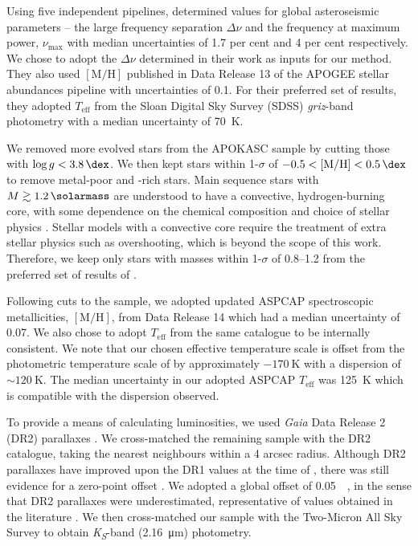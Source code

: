 \documentclass[fleqn,usenatbib]{mnras}
\newcommand{\numax}{\ensuremath{{\nu_\mathrm{max}}}}
\newcommand{\dnu}{\ensuremath{\Delta\nu}}
\newcommand{\metallicity}{\ensuremath{[\mathrm{M}/\mathrm{H}]}}
\newcommand{\teff}{\ensuremath{T_\mathrm{eff}}}
\begin{document}
Using five independent pipelines,  determined values for global asteroseismic parameters -- the large frequency separation $\dnu$ and the frequency at maximum power, $\numax$ with median uncertainties of 1.7 per cent and 4 per cent respectively. We chose to adopt the $\dnu$ determined in their work as inputs for our method. They also used $\metallicity$ published in Data Release 13 \citep[DR13;][]{Albareti.AllendePrieto.ea2017} of the APOGEE stellar abundances pipeline \citep[ASPCAP;][]{GarciaPerez.AllendePrieto.ea2016} with uncertainties of \SI{0.1}{\dex}. For their preferred set of results, they adopted $\teff$ from the Sloan Digital Sky Survey (SDSS) \emph{griz}-band photometry \citep{Pinsonneault.An.ea2012} with a median uncertainty of \SI{70}{\kelvin}.

We removed more evolved stars from the APOKASC sample by cutting those with $\log g < \SI{3.8}{\dex}$. We then kept stars within 1-$\sigma$ of $-0.5 < \metallicity < \SI{0.5}{\dex}$ to remove metal-poor and -rich stars. Main sequence stars with $M \gtrsim \SI{1.2}{\solarmass}$ are understood to have a convective, hydrogen-burning core, with some dependence on the chemical composition and choice of stellar physics \citep{Appourchaux.Antia.ea2015}. Stellar models with a convective core require the treatment of extra stellar physics such as overshooting, which is beyond the scope of this work. Therefore, we keep only stars with masses within 1-$\sigma$ of \SIrange{0.8}{1.2}{\solarmass} from the preferred set of results of .

Following cuts to the sample, we adopted updated ASPCAP spectroscopic metallicities, \metallicity, from Data Release 14 \citep[DR14;][]{Blanton.Bershady.ea2017} which had a median uncertainty of \SI{0.07}{\dex}. We also chose to adopt $\teff$ from the same catalogue to be internally consistent. We note that our chosen effective temperature scale is offset from the photometric temperature scale of  by approximately $- \SI{170}{\kelvin}$ with a dispersion of $\sim \SI{120}{\kelvin}$. The median uncertainty in our adopted ASPCAP $\teff$ was \SI{125}{\kelvin} which is compatible with the dispersion observed.

To provide a means of calculating luminosities, we used \emph{Gaia} Data Release 2 (DR2) parallaxes \citep{GaiaCollaboration.Prusti.ea2016, GaiaCollaboration.Brown.ea2018}. We cross-matched the remaining sample with the DR2 catalogue, taking the nearest neighbours within a 4 arcsec radius. Although DR2 parallaxes have improved upon the DR1 values at the time of , there was still evidence for a zero-point offset \citep{Lindegren.Hernandez.ea2018}. We adopted a global offset of \SI{0.05}{\milli\aarcsec}, in the sense that DR2 parallaxes were underestimated, representative of values obtained in the literature \citep[see e.g.][]{Riess.Casertano.ea2018, Zinn.Pinsonneault.ea2019, Hall.Davies.ea2019, Chan.Bovy2020}. We then cross-matched our sample with the Two-Micron All Sky Survey \citep[2MASS;][]{Skrutskie.Cutri.ea2006} to obtain \emph{K\textsubscript{S}}-band (\SI{2.16}{\micro\metre}) photometry.
\end{document}
